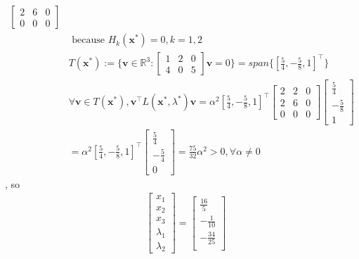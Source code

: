 \documentclass[10pt]{article}
\begin{document}
\begin{enumerate}
\begin{enumerate}
\begin{align*}
\begin{bmatrix}
                2 & 6 & 0\\
                0 & 0 & 0
            \end{bmatrix}\\
            &\text{ because }H_k(\mathbf{x}^*)=0,k=1,2\\
            &T(\mathbf{x}^*):=\{\mathbf{v}\in\mathbb{R}^3:\begin{bmatrix}
                1 & 2 & 0\\
                4 & 0 & 5
            \end{bmatrix}\mathbf{v}=0\}=span\{{[\frac{5}{4},-\frac{5}{8},1]}^\top\}\\
            &\forall \mathbf{v}\in T(\mathbf{x}^*),\mathbf{v}^\top L(\mathbf{x}^*,\lambda^*)\mathbf{v}=\alpha^2 {[\frac{5}{4},-\frac{5}{8},1]}^\top\begin{bmatrix}
                2 & 2 & 0\\
                2 & 6 & 0\\
                0 & 0 & 0
            \end{bmatrix}\begin{bmatrix}
                \frac{5}{4}\\
                -\frac{5}{8}\\
                1
            \end{bmatrix}\\
            &=\alpha^2{[\frac{5}{4},-\frac{5}{8},1]}^\top\begin{bmatrix}
                \frac{5}{4}\\
                -\frac{5}{4}\\
                0
            \end{bmatrix}=\frac{75}{32}\alpha^2>0,\forall\alpha\neq0
        \end{align*}
        , so \begin{align*}
            &\begin{bmatrix}
                x_1\\
                x_2\\
                x_3\\
                \lambda_1\\
                \lambda_2
            \end{bmatrix}=\begin{bmatrix}
                \frac{16}{5}\\
                -\frac{1}{10}\\
                -\frac{34}{25}\\

\end{bmatrix}
\end{align*}
\end{enumerate}
\end{enumerate}
\end{document}
